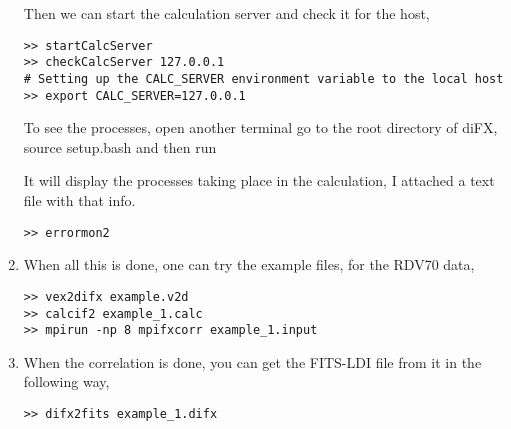 \begin{enumerate}
Then we can start the calculation server and check it for the host,
\begin{verbatim}
>> startCalcServer
>> checkCalcServer 127.0.0.1
# Setting up the CALC_SERVER environment variable to the local host
>> export CALC_SERVER=127.0.0.1
\end{verbatim}

To see the processes, open another terminal go to the root directory of diFX, source setup.bash and then run

It will display the processes taking place in the calculation, I attached a text file with that info.
\begin{verbatim}
>> errormon2
\end{verbatim}

\item When all this is done, one can try the example files, for the RDV70 data,
\begin{verbatim}
>> vex2difx example.v2d
>> calcif2 example_1.calc
>> mpirun -np 8 mpifxcorr example_1.input
\end{verbatim}


\item When the correlation is done, you can get the FITS-LDI file from it in the following way,

\begin{verbatim}
>> difx2fits example_1.difx
\end{verbatim}


\end{enumerate}
   